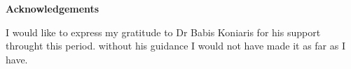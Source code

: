 \begin{center}
\LARGE\textbf {Acknowledgements}
\end{center}
\vspace{5pt}

\noindent I would like to express my gratitude to Dr Babis Koniaris for his support throught this period. without his guidance I would not have made it as far as I have. 
